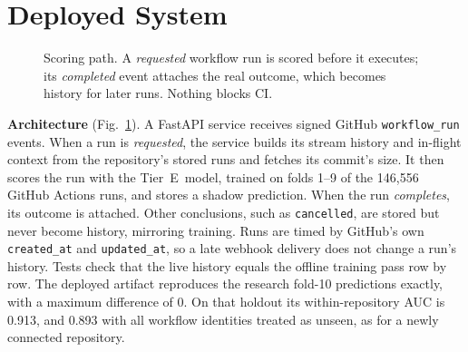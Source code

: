 \documentclass[conference]{IEEEtran}
\newcommand{\tierE}{Tier~E}
\begin{document}
\section{Deployed System}
\label{sec:system}

\begin{figure}[t]
\centering
{}
\caption{Scoring path. A \emph{requested} workflow run is scored before it executes; its \emph{completed} event attaches the real outcome, which becomes history for later runs. Nothing blocks CI.}
\label{fig:arch}
\end{figure}

\textbf{Architecture} (Fig.~\ref{fig:arch}). A FastAPI service receives signed GitHub \texttt{workflow\_run} events. When a run is \emph{requested}, the service builds its stream history and in-flight context from the repository's stored runs and fetches its commit's size. It then scores the run with the \tierE\ model, trained on folds 1--9 of the 146{,}556 GitHub Actions runs, and stores a shadow prediction. When the run \emph{completes}, its outcome is attached. Other conclusions, such as \texttt{cancelled}, are stored but never become history, mirroring training. Runs are timed by GitHub's own \texttt{created\_at} and \texttt{updated\_at}, so a late webhook delivery does not change a run's history. Tests check that the live history equals the offline training pass row by row. The deployed artifact reproduces the research fold-10 predictions exactly, with a maximum difference of 0. On that holdout its within-repository AUC is 0.913, and 0.893 with all workflow identities treated as unseen, as for a newly connected repository.
\end{document}
